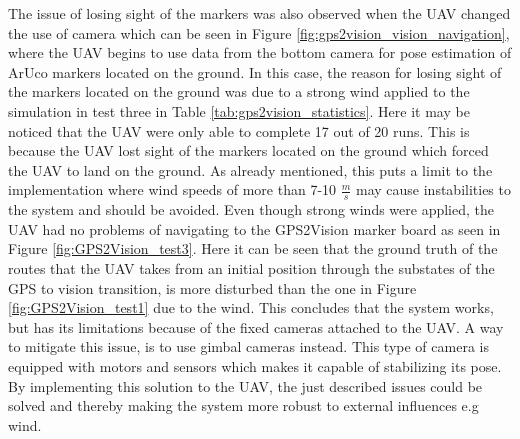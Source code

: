 \documentclass[../Head/report.tex]{subfiles}
\begin{document}
The issue of losing sight of the markers was also observed when the UAV changed the use of camera which can be seen in Figure \ref{fig:gps2vision_vision_navigation}, where the UAV begins to use data from the bottom camera for pose estimation of ArUco markers located on the ground. In this case, the reason for losing sight of the markers located on the ground was due to a strong wind applied to the simulation in test three in Table \ref{tab:gps2vision_statistics}. Here it may be noticed that the UAV were only able to complete 17 out of 20 runs. This is because the UAV lost sight of the markers located on the ground which forced the UAV to land on the ground. As already mentioned, this puts a limit to the implementation where wind speeds of more than 7-10 $\frac{m}{s}$ may cause instabilities to the system and should be avoided. Even though strong winds were applied, the UAV had no problems of navigating to the GPS2Vision marker board as seen in Figure \ref{fig:GPS2Vision_test3}. Here it can be seen that the ground truth of the routes that the UAV takes from an initial position through the substates of the GPS to vision transition, is more disturbed than the one in Figure \ref{fig:GPS2Vision_test1} due to the wind. This concludes that the system works, but has its limitations because of the fixed cameras attached to the UAV. A way to mitigate this issue, is to use gimbal cameras instead. This type of camera is equipped with motors and sensors which makes it capable of stabilizing its pose. By implementing this solution to the UAV, the just described issues could be solved and thereby making the system more robust to external influences e.g wind.     
\end{document}
